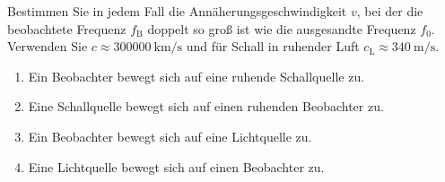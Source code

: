 \begin{ExerciseBlock}
Bestimmen Sie in jedem Fall die Annäherungsgeschwindigkeit $v$, bei der die beobachtete Frequenz $f_\mathrm B$ doppelt so groß ist wie die ausgesandte Frequenz $f_0$. Verwenden Sie $c\approx\qty{300000}{\kilo\metre\per\second}$ und für Schall in ruhender Luft $c_\mathrm L\approx\qty{340}{\metre\per\second}$.
\begin{enumerate}
\item Ein Beobachter bewegt sich auf eine ruhende Schallquelle zu.
\item Eine Schallquelle bewegt sich auf einen ruhenden Beobachter zu.
\item Ein Beobachter bewegt sich auf eine Lichtquelle zu.
\item Eine Lichtquelle bewegt sich auf einen Beobachter zu.
\end{enumerate}
\end{ExerciseBlock}
